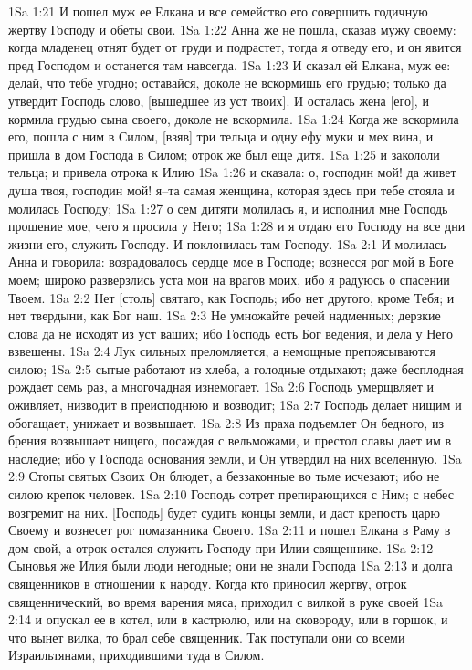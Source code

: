 1Sa 1:21  И пошел муж ее Елкана и все семейство его совершить годичную жертву Господу и обеты свои.
1Sa 1:22  Анна же не пошла, сказав мужу своему: когда младенец отнят будет от груди и подрастет, тогда я отведу его, и он явится пред Господом и останется там навсегда.
1Sa 1:23  И сказал ей Елкана, муж ее: делай, что тебе угодно; оставайся, доколе не вскормишь его грудью; только да утвердит Господь слово, [вышедшее из уст твоих]. И осталась жена [его], и кормила грудью сына своего, доколе не вскормила.
1Sa 1:24  Когда же вскормила его, пошла с ним в Силом, [взяв] три тельца и одну ефу муки и мех вина, и пришла в дом Господа в Силом; отрок же был еще дитя.
1Sa 1:25  и закололи тельца; и привела отрока к Илию
1Sa 1:26  и сказала: о, господин мой! да живет душа твоя, господин мой! я--та самая женщина, которая здесь при тебе стояла и молилась Господу;
1Sa 1:27  о сем дитяти молилась я, и исполнил мне Господь прошение мое, чего я просила у Него;
1Sa 1:28  и я отдаю его Господу на все дни жизни его, служить Господу. И поклонилась там Господу.
1Sa 2:1  И молилась Анна и говорила: возрадовалось сердце мое в Господе; вознесся рог мой в Боге моем; широко разверзлись уста мои на врагов моих, ибо я радуюсь о спасении Твоем.
1Sa 2:2  Нет [столь] святаго, как Господь; ибо нет другого, кроме Тебя; и нет твердыни, как Бог наш.
1Sa 2:3  Не умножайте речей надменных; дерзкие слова да не исходят из уст ваших; ибо Господь есть Бог ведения, и дела у Него взвешены.
1Sa 2:4  Лук сильных преломляется, а немощные препоясываются силою;
1Sa 2:5  сытые работают из хлеба, а голодные отдыхают; даже бесплодная рождает семь раз, а многочадная изнемогает.
1Sa 2:6  Господь умерщвляет и оживляет, низводит в преисподнюю и возводит;
1Sa 2:7  Господь делает нищим и обогащает, унижает и возвышает.
1Sa 2:8  Из праха подъемлет Он бедного, из брения возвышает нищего, посаждая с вельможами, и престол славы дает им в наследие; ибо у Господа основания земли, и Он утвердил на них вселенную.
1Sa 2:9  Стопы святых Своих Он блюдет, а беззаконные во тьме исчезают; ибо не силою крепок человек.
1Sa 2:10  Господь сотрет препирающихся с Ним; с небес возгремит на них. [Господь] будет судить концы земли, и даст крепость царю Своему и вознесет рог помазанника Своего.
1Sa 2:11  и пошел Елкана в Раму в дом свой, а отрок остался служить Господу при Илии священнике.
1Sa 2:12  Сыновья же Илия были люди негодные; они не знали Господа
1Sa 2:13  и долга священников в отношении к народу. Когда кто приносил жертву, отрок священнический, во время варения мяса, приходил с вилкой в руке своей
1Sa 2:14  и опускал ее в котел, или в кастрюлю, или на сковороду, или в горшок, и что вынет вилка, то брал себе священник. Так поступали они со всеми Израильтянами, приходившими туда в Силом.
